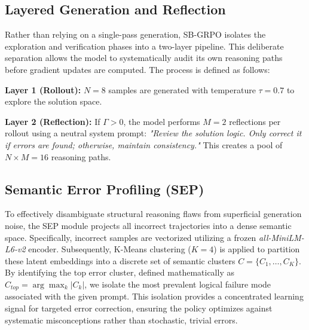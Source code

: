 \subsection{Layered Generation and Reflection}\label{subsec:layer-generation-reflection}
Rather than relying on a single-pass generation, SB-GRPO isolates the exploration and verification phases into a two-layer pipeline. This deliberate separation allows the model to systematically audit its own reasoning paths before gradient updates are computed. The process is defined as follows:

\textbf{Layer 1 (Rollout):} $N=8$ samples are generated with temperature $\tau=0.7$ to explore the solution space.

\textbf{Layer 2 (Reflection):} If $\Gamma > 0$, the model performs $M=2$ reflections per rollout using a neutral system prompt: \textit{"Review the solution logic. Only correct it if errors are found; otherwise, maintain consistency."} This creates a pool of $N \times M = 16$ reasoning paths.


\subsection{Semantic Error Profiling (SEP)}\label{subsec:SEP}
To effectively disambiguate structural reasoning flaws from superficial generation noise, the SEP module projects all incorrect trajectories into a dense semantic space. Specifically, incorrect samples are vectorized utilizing a frozen \textit{all-MiniLM-L6-v2} encoder. Subsequently, K-Means clustering ($K=4$) is applied to partition these latent embeddings into a discrete set of semantic clusters $C = \{C_1, \dots, C_K\}$. By identifying the top error cluster, defined mathematically as $C_{top} = \arg\max_k |C_k|$, we isolate the most prevalent logical failure mode associated with the given prompt. This isolation provides a concentrated learning signal for targeted error correction, ensuring the policy optimizes against systematic misconceptions rather than stochastic, trivial errors.
